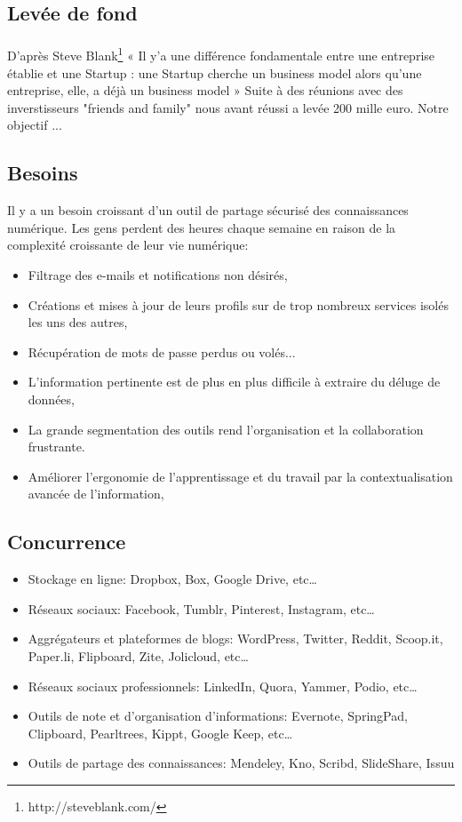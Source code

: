 \documentclass[12pt,oneside,a4paper]{article}
\begin{document}
\subsection{Levée de fond}
\paragraph{}
D'après Steve Blank\footnote{http://steveblank.com/} « Il y'a une différence fondamentale entre une entreprise établie et 
une Startup : une Startup cherche un business model alors qu’une entreprise, elle, a déjà un 
business model »\newline
Suite à des réunions avec des inverstisseurs "friends and family" nous avant réussi a levée 200 mille euro.
Notre objectif ...
\subsection{Besoins}
Il y a un besoin croissant d'un outil de partage sécurisé des connaissances numérique. Les gens perdent des heures chaque semaine en raison de la complexité croissante de leur vie numérique:
\begin{itemize}
\item Filtrage des e-mails et notifications non désirés,
\item Créations et mises à jour de leurs profils sur de trop nombreux services isolés les uns des autres,
\item Récupération de mots de passe perdus ou volés...
\item L'information pertinente est de plus en plus difficile à extraire du déluge de données,
\item La grande segmentation des outils rend l'organisation et la collaboration frustrante.
\item Améliorer l'ergonomie de l'apprentissage et du travail par la contextualisation avancée de l'information,

\end{itemize}
\subsection{Concurrence}
\begin{itemize}
\item Stockage en ligne: Dropbox, Box, Google Drive, etc…
\item Réseaux sociaux: Facebook, Tumblr, Pinterest, Instagram, etc…
\item Aggrégateurs et plateformes de blogs: WordPress, Twitter, Reddit, Scoop.it, Paper.li, Flipboard, Zite, Jolicloud, etc…
\item Réseaux sociaux professionnels: LinkedIn, Quora, Yammer, Podio, etc…
\item Outils de note et d'organisation d'informations: Evernote, SpringPad, Clipboard, Pearltrees, Kippt, Google Keep, etc…
\item Outils de partage des connaissances: Mendeley, Kno, Scribd, SlideShare, Issuu

\end{itemize}
\end{document}
